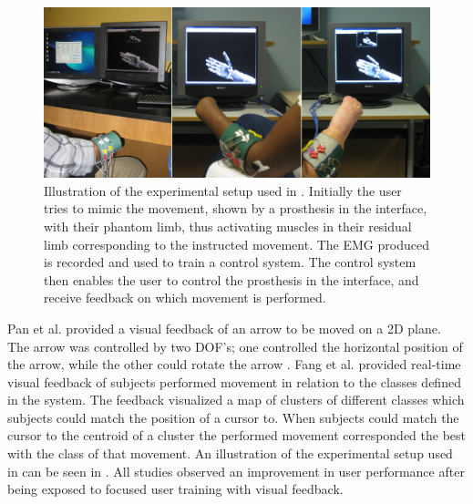 \begin{figure}[H]                 
	\includegraphics[width=.8\textwidth]{figures/xBackground/PowellUserTraining}  
	\caption{Illustration of the experimental setup used in \cite{Powell2014}. Initially the user tries to mimic the movement, shown by a prosthesis in the interface, with their phantom limb, thus activating muscles in their residual limb corresponding to the instructed movement. The EMG produced is recorded and used to train a control system. The control system then enables the user to control the prosthesis in the interface, and receive feedback on which movement is performed.}
	\label{fig:PowellUserTraining} 
\end{figure}

Pan et al. \cite{Pan2017} provided a visual feedback of an arrow to be moved on a 2D plane. The arrow was controlled by two DOF's; one controlled the horizontal position of the arrow, while the other could rotate the arrow \cite{Pan2017}. Fang et al. \cite{Fang2017} provided real-time visual feedback of subjects performed movement in relation to the classes defined in the system. The feedback visualized a map of clusters of different classes which subjects could match the position of a cursor to. When subjects could match the cursor to the centroid of a cluster the performed movement corresponded the best with the class of that movement. \cite{Fang2017} An illustration of the experimental setup used in \cite{Fang2017} can be seen in . All studies observed an improvement in user performance after being exposed to focused user training with visual feedback.

